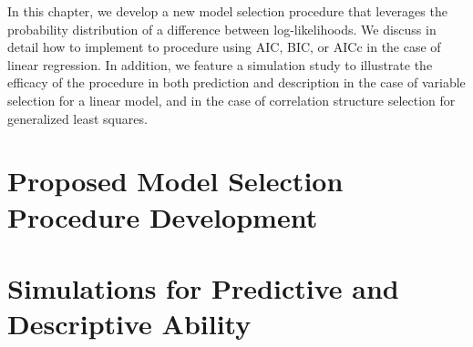 \doublespace		
{}
		In this chapter, we develop a new model selection procedure that leverages the probability distribution of a difference between log-likelihoods. We discuss in detail how
		to implement to procedure using AIC, BIC, or AICc in the case of linear regression.  In addition, we feature a simulation study to illustrate the efficacy of the procedure
		in both prediction and description in the case of variable selection for a linear model, and in the case of correlation structure selection for generalized least squares.

		\section{Proposed Model Selection Procedure Development} \label{sec:proposed_method}
		
		\section{Simulations for Predictive and Descriptive Ability} \label{sec:sim_model_select}
		